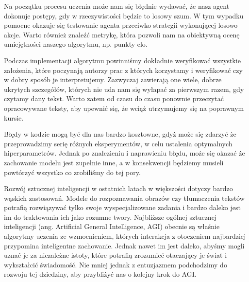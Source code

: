 \documentclass[licencjacka]{pracamgr}
\begin{document}
Na początku procesu uczenia może nam się błędnie wydawać, że nasz agent dokonuje postępy, gdy w rzeczywistości będzie to losowy szum. W tym wypadku pomocne okazuje się testowanie agenta przeciwko strategii wykonującej losowo akcje. Warto również znaleźć metrykę, która pozwoli nam na obiektywną ocenę umiejętności naszego algorytmu, np. punkty elo.

Podczas implementacji algorytmu powinniśmy dokładnie weryfikować wszystkie założenia, które poczynają autorzy prac z których korzystamy i weryfikować czy w dobry sposób je interpretujemy. Zazwyczaj zawierają one wiele, dobrze ukrytych szczegółów, których nie uda nam się wyłapać za pierwszym razem, gdy czytamy dany tekst. Warto zatem od czasu do czasu ponownie przeczytać opracowywane teksty, aby upewnić się, że wciąż utrzymujemy się na poprawnym kursie.

Błędy w kodzie mogą być dla nas bardzo kosztowne, gdyż może się zdarzyć że przeprowadzimy serię różnych eksperymentów, w celu ustalenia optymalnych hiperparametrów. Jednak po znalezieniu i naprawieniu błędu, może się okazać że zachowanie modelu jest zupełnie inne, a w konsekwencji będziemy musieli powtórzyć wszystko co zrobiliśmy do tej pory.

Rozwój sztucznej inteligencji w ostatnich latach w większości dotyczy bardzo wąskich zastosowań. Modele do rozpoznawania obrazów czy tłumaczenia tekstów potrafią rozwiązywać tylko swoje wyspecjalizowane zadania i bardzo daleko jest im do traktowania ich jako rozumne twory. Najbliższe ogólnej sztucznej inteligencji (ang. Artificial General Intelligence, AGI) obecnie są właśnie algorytmy uczenia ze wzmocnieniem, których interakcja z otoczeniem najbardziej przypomina inteligentne zachowanie. Jednak nawet im jest daleko, abyśmy mogli uznać je za niezależne istoty, które potrafią zrozumieć otaczający je świat i wykształcić świadomość. Nie mniej jednak z entuzjazmem podchodzimy do rozwoju tej dziedziny, aby przybliżyć nas o kolejny krok do AGI.






\end{document}
